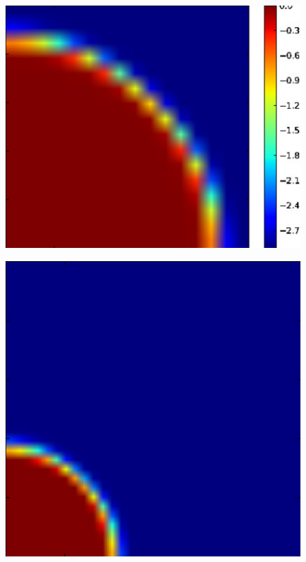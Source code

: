 \begin{figure}[t]
{  \hspace{0.1cm}
  \includegraphics[scale=0.3]{i1-HIIcontour_500myr_nx16.pdf}
  \hfill}
\vspace{0.2cm}
\centerline{\hfill
  \includegraphics[scale=0.3]{i1-HIIcontour_10myr_nx32.pdf}
}
\end{figure}
